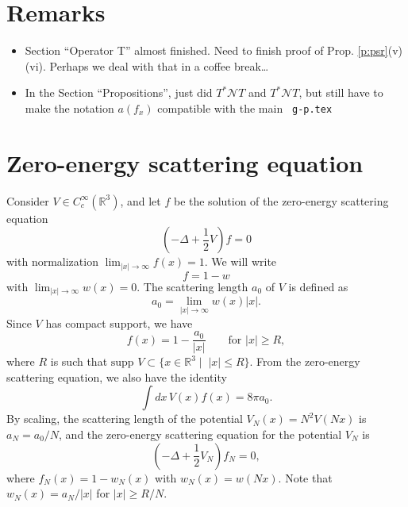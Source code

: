 \documentclass[a4paper,11pt]{article}
\newcommand{\R}{\mathds{R}}
\newcommand{\N}{\mathcal{N}}
\begin{document}
\tableofcontents


\section{Remarks}


\begin{itemize}
  \item Section ``Operator T'' almost finished. Need to finish proof of Prop.
    \ref{p:psr}(v)(vi). Perhaps we deal with that in a coffee break\dots
  \item In the Section ``Propositions'', just did $T^* \N T$ and $T^* \N T$,
    but still have to make the notation $a(f_x)$ compatible with the main {\tt
    g-p.tex}
\end{itemize}


\section{Zero-energy scattering equation}


Consider $V \in C_c^\infty(\R^3)$, and let $f$ be the solution of the
zero-energy scattering equation
\begin{displaymath}
  \left( -\Delta + \frac{1}{2} V \right) f = 0
\end{displaymath}
with normalization $\lim_{|x|\to\infty} f(x) = 1$. We will write
\begin{displaymath}
  f = 1 - w
\end{displaymath}
with $\lim_{|x|\to\infty} w(x) = 0$. The scattering length $a_0$ of $V$ is
defined as
\begin{displaymath}
  a_0 = \lim_{|x| \to \infty} w(x)|x|.
\end{displaymath}
Since $V$ has compact support, we have
\begin{displaymath}
  f(x) = 1 - \frac{a_0}{|x|} \qquad \text{for } |x| \ge R,
\end{displaymath}
where $R$ is such that $\text{supp }V \subset \{ x \in \R^3 \; | \;\; |x| \le
R \}$. From the zero-energy scattering equation, we also have the identity
\begin{displaymath}
  \int dx \, V(x) f(x) = 8 \pi a_0.
\end{displaymath}
By scaling, the scattering length of the potential $V_N(x) = N^2 V(Nx)$ is
$a_N = a_0/N$, and the zero-energy scattering equation for the potential
$V_N$ is
\begin{displaymath}
  \left( -\Delta + \frac{1}{2} V_N \right) f_N = 0,
\end{displaymath}
where $f_N(x) = 1 - w_N(x)$ with $w_N(x) = w(Nx)$. Note that $w_N(x) =
a_N/|x|$ for $|x| \ge R/N$.
\end{document}
